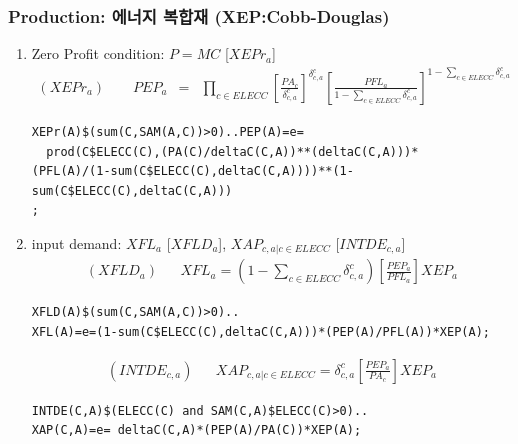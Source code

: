 \documentclass[10pt,compress,slidetop,%
			   hyperref={unicode},xcolor={svgnames},%
			   t]{beamer}
\begin{document}
\begin{frame}[fragile]
\frametitle{Production: 에너지 복합재 (XEP:Cobb-Douglas)}
\begin{scriptsize}
\begin{enumerate}
\item{Zero Profit condition: $P=MC$ [$XEPr_a$]}
\begin{eqnarray*}
(XEPr_a)\qquad PEP_a&=&\prod_{c\in ELECC}\left[\frac{PA_c}{\delta^c_{c,a}}\right]^{\delta^c_{c,a}}
\left[\frac{PFL_a}{1-\sum_{c\in ELECC}\delta^c_{c,a}}\right]^{1-\sum_{c\in ELECC}\delta^c_{c,a}}
\end{eqnarray*}

\begin{verbatim}
XEPr(A)$(sum(C,SAM(A,C))>0)..PEP(A)=e=
  prod(C$ELECC(C),(PA(C)/deltaC(C,A))**(deltaC(C,A)))*
(PFL(A)/(1-sum(C$ELECC(C),deltaC(C,A))))**(1-sum(C$ELECC(C),deltaC(C,A)))
;
\end{verbatim}
\item{input demand: $XFL_a$ [$XFLD_a$], $XAP_{c,a|c\in ELECC}$ [$INTDE_{c,a}$] }
\begin{eqnarray*}
(XFLD_a)& &XFL_a=(1-\sum_{c\in ELECC}\delta^c_{c,a})\left[\frac{PEP_a}{PFL_a}\right]XEP_a
\end{eqnarray*}

\begin{verbatim} 
XFLD(A)$(sum(C,SAM(A,C))>0)..
XFL(A)=e=(1-sum(C$ELECC(C),deltaC(C,A)))*(PEP(A)/PFL(A))*XEP(A);
\end{verbatim}

\begin{eqnarray*}
(INTDE_{c,a})& &XAP_{c,a|c\in ELECC}=\delta^c_{c,a}\left[\frac{PEP_a}{PA_c}\right]XEP_a
\end{eqnarray*}

\begin{verbatim} 
INTDE(C,A)$(ELECC(C) and SAM(C,A)$ELECC(C)>0)..
XAP(C,A)=e= deltaC(C,A)*(PEP(A)/PA(C))*XEP(A);
\end{verbatim}
   
\end{enumerate}
\end{scriptsize}
\end{frame}
\end{document}
